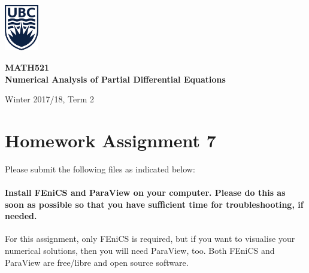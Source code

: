 

\usepackage{amsfonts,amsmath,amssymb,braket,xcolor,enumerate,graphicx}
\usepackage{listings,multicol,mathtools,textcomp,tikz,pgfplots,wrapfig}
\usepackage{tabularx}
\usepackage{booktabs}
\usetikzlibrary{arrows}

\pagestyle{empty}
\setlength{\parindent}{0pt}
\setlength{\parskip}{6pt}



\begin{minipage}{.2\textwidth}
\includegraphics[width=42pt]{ubc-logo.png}
\end{minipage}
\hfill
\begin{minipage}{.75\textwidth}
\setlength{\parskip}{6pt}
\begin{flushright}
{\sffamily
\textbf{MATH521}\\
\textbf{Numerical Analysis of Partial Differential Equations}

Winter 2017/18, Term 2\\
}
\end{flushright}
\end{minipage}

\section*{Homework Assignment 7}

Please submit the following files as indicated below:%

\paragraph*{Install \textsf{FEniCS} and \textsf{ParaView} on your computer. Please do this as soon as possible so that you have sufficient time for troubleshooting, if needed.}

For this assignment, only \textsf{FEniCS} is required, but if you want to visualise your numerical solutions, then you will need \textsf{ParaView}, too. Both \textsf{FEniCS} and \textsf{ParaView} are free/libre and open source software.

